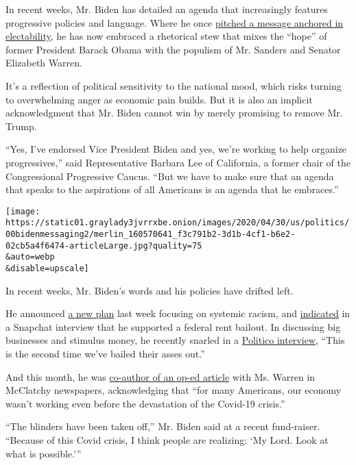 In recent weeks, Mr. Biden has detailed an agenda that increasingly
features progressive policies and language. Where he once
\href{https://www.nytimes3xbfgragh.onion/2019/05/18/us/politics/joe-biden-philadelphia-rally.html}{pitched
a message anchored in electability}, he has now embraced a rhetorical
stew that mixes the ``hope'' of former President Barack Obama with the
populism of Mr. Sanders and Senator Elizabeth Warren.

It's a reflection of political sensitivity to the national mood, which
risks turning to overwhelming anger as economic pain builds. But it is
also an implicit acknowledgment that Mr. Biden cannot win by merely
promising to remove Mr. Trump.

``Yes, I've endorsed Vice President Biden and yes, we're working to help
organize progressives,'' said Representative Barbara Lee of California,
a former chair of the Congressional Progressive Caucus. ``But we have to
make sure that an agenda that speaks to the aspirations of all Americans
is an agenda that he embraces.''

\texttt{[image: https://static01.graylady3jvrrxbe.onion/images/2020/04/30/us/politics/00bidenmessaging2/merlin\_160570641\_f3c791b2-3d1b-4cf1-b6e2-02cb5a4f6474-articleLarge.jpg?quality=75\\\&auto=webp\\\&disable=upscale]}

In recent weeks, Mr. Biden's words and his policies have drifted left.

He announced
\href{https://joebiden.com/highlights-from-joe-bidens-agenda-for-the-black-community/}{a
new plan} last week focusing on systemic racism, and
\href{https://www.vanityfair.com/news/2020/05/who-you-calling-sleepy-joe-biden-on-his-youth-agenda-internet-memes-and-fighting-trump-from-his-house}{indicated}
in a Snapchat interview that he supported a federal rent bailout. In
discussing big businesses and stimulus money, he recently snarled in a
\href{https://www.politico.com/news/2020/04/25/joe-biden-green-stimulus-207848}{Politico
interview}, ``This is the second time we've bailed their asses out.''

And this month, he was
\href{https://www.miamiherald.com/article242350451.html}{co-author of an
op-ed article} with Ms. Warren in McClatchy newspapers, acknowledging
that ``for many Americans, our economy wasn't working even before the
devastation of the Covid-19 crisis.''

``The blinders have been taken off,'' Mr. Biden said at a recent
fund-raiser. ``Because of this Covid crisis, I think people are
realizing: `My Lord. Look at what is possible.'''

